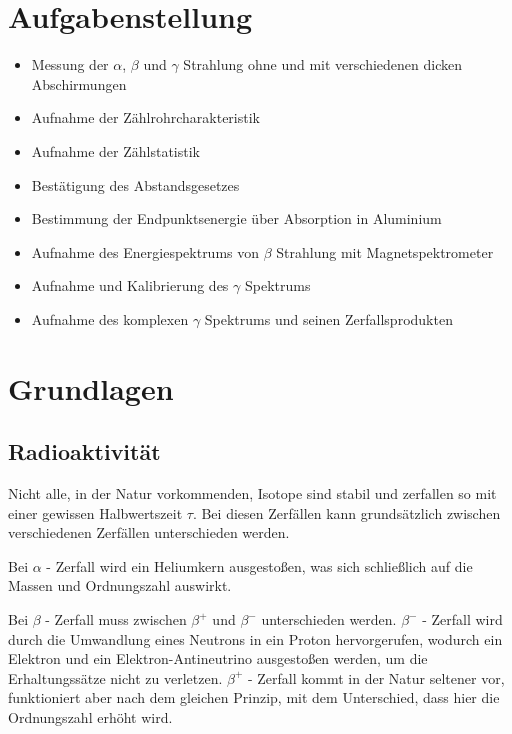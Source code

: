 \documentclass[12pt,english,ngerman]{scrartcl}
\begin{document}
%
\tableofcontents
\newpage

\section{Aufgabenstellung\label{Auf}}



\begin{itemize}
    \item Messung der $\alpha$, $\beta$ und $\gamma$ Strahlung ohne und mit verschiedenen dicken Abschirmungen
    \item Aufnahme der Zählrohrcharakteristik
    \item Aufnahme der Zählstatistik
    \item Bestätigung des Abstandsgesetzes
    \item Bestimmung der Endpunktsenergie über Absorption in Aluminium
    \item Aufnahme des Energiespektrums von $\beta$ Strahlung mit Magnetspektrometer
    \item Aufnahme und Kalibrierung des $\gamma$ Spektrums
    \item Aufnahme des komplexen $\gamma$ Spektrums und seinen Zerfallsprodukten
\end{itemize}

\section{Grundlagen}\label{Grund}

\subsection{Radioaktivität}
Nicht alle, in der Natur vorkommenden, Isotope sind stabil und zerfallen so mit einer gewissen Halbwertszeit $\tau$.
Bei diesen Zerfällen kann grundsätzlich zwischen verschiedenen Zerfällen unterschieden werden.

Bei $\alpha$ - Zerfall wird ein Heliumkern ausgestoßen, was sich schließlich auf die Massen und Ordnungszahl auswirkt.

Bei $\beta$ - Zerfall muss zwischen $\beta^+$ und $\beta^-$ unterschieden werden.
$\beta^-$ - Zerfall wird durch die Umwandlung eines Neutrons in ein Proton hervorgerufen, wodurch ein Elektron und ein 
Elektron-Antineutrino ausgestoßen werden, um die Erhaltungssätze nicht zu verletzen.
$\beta^+$ - Zerfall kommt in der Natur seltener vor, funktioniert aber nach dem gleichen Prinzip, mit dem Unterschied, 
dass hier die Ordnungszahl erhöht wird.
\end{document}
